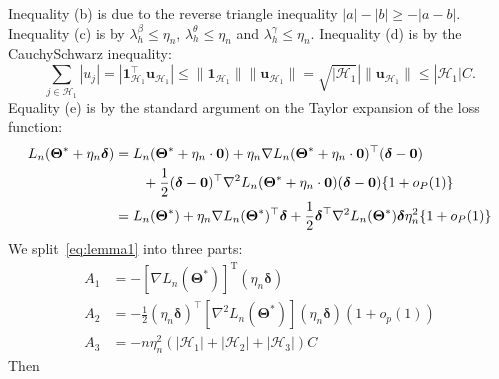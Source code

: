 \documentclass[12pt,letter]{article}\usepackage[]{graphicx}\usepackage[]{color}
\newcommand{\bThetastar}{\boldsymbol{\Theta}^{*}}
\newcommand{\bdelta}{\boldsymbol{\delta}}
\newcommand{\mH}{\mathcal{H}}
\begin{document}
Inequality (b) is due to the reverse triangle inequality $|a|-|b|\geq-|a-b|$. Inequality (c) is by $\lambda_{h}^\beta\leq\eta_{n}$, $\lambda_{h}^{\theta}\leq\eta_{n}$ and $\lambda_{h}^{\gamma}\leq\eta_{n}$. Inequality (d) is by the Cauchy\textendash Schwarz
inequality:
\[
\sum_{j\in \mathcal{H}_{1}}|u_{j}|=|\mathbf{1}_{\mH_{1}}^{\top}\mathbf{u}_{\mH_{1}}|\leq\|\mathbf{1}_{\mH_{1}}\|\|\mathbf{u}_{\mH_{1}}\|=\sqrt{|\mH_{1}}|\|\mathbf{u}_{\mH_{1}}\|\leq|\mH_{1}|C.
\]
Equality (e) is by the standard argument on the Taylor expansion of the loss function:
\begin{align*}
L_{n}(\bThetastar+\eta_{n}\bdelta) & =L_{n}(\bThetastar+\eta_{n}\cdot\mathbf{0})+\eta_{n}\nabla L_{n}(\bThetastar+\eta_{n}\cdot\mathbf{0})^{\top}(\bdelta-\mathbf{0})\\
& \qquad+\frac{1}{2}(\bdelta-\mathbf{0})^{\top}\nabla^{2}L_{n}(\bThetastar+\eta_{n}\cdot\mathbf{0})(\bdelta-\mathbf{0})\{1+\op(1)\}\\
& =L_{n}(\bThetastar)+\eta_{n}\nabla L_{n}(\bThetastar)^{\top}\bdelta+\frac{1}{2}\bdelta^{\top}\nabla^{2}L_{n}(\bThetastar)\bdelta\eta_{n}^{2}\{1+\op(1)\}
\end{align*}
We split~\eqref{eq:lemma1} into three parts:
\[
\begin{aligned}A_{1} & =-\left[\nabla L_{n}\left(\boldsymbol{\Theta}^{*}\right)\right]^{\mathrm{T}}\left(\eta_{n}\boldsymbol{\delta}\right)\\
A_{2} & =-\frac{1}{2}\left(\eta_{n}\boldsymbol{\delta}\right)^{\top}\left[\nabla^{2}L_{n}\left(\boldsymbol{\Theta}^{*}\right)\right]\left(\eta_{n}\boldsymbol{\delta}\right)\left(1+o_{p}(1)\right)\\
A_{3} & =-n\eta_{n}^{2}\left(\left|\mathcal{H}_{1}\right|+\left|\mathcal{H}_{2}\right|+\left|\mathcal{H}_{3}\right|\right)C
\end{aligned}
\]
Then
\end{document}
